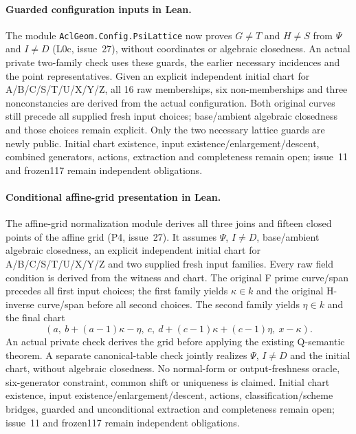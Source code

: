 \documentclass[11pt,oneside]{article}
\theoremstyle{definition}
\theoremstyle{remark}
\newcommand{\lean}[1]{\nolinkurl{#1}}
\begin{document}
\paragraph{Guarded configuration inputs in Lean.}
The module \lean{AclGeom.Config.PsiLattice} now proves $G\ne T$ and
$H\ne S$ from $\Psi$ and $I\ne D$ (L0c, issue~27), without coordinates
or algebraic closedness. An actual private two-family check uses these
guards, the earlier necessary incidences and the point representatives.
Given an explicit independent initial chart for A/B/C/S/T/U/X/Y/Z, all
16 raw memberships, six non-memberships and three nonconstancies are
derived from the actual configuration. Both original curves still precede
all supplied fresh input choices; base/ambient algebraic closedness and
those choices remain explicit. Only the two necessary lattice guards are
newly public. Initial chart existence, input existence/enlargement/descent,
combined generators, actions, extraction and completeness remain open;
issue~11 and frozen117 remain independent obligations.

\clearpage
\paragraph{Conditional affine-grid presentation in Lean.}
The affine-grid normalization module derives all
three joins and fifteen closed points of the affine grid (P4, issue~27).
It assumes $\Psi$, $I\ne D$, base/ambient algebraic closedness, an explicit
independent initial chart for A/B/C/S/T/U/X/Y/Z and two supplied fresh
input families. Every raw field condition is derived from the witness
and chart. The original F prime curve/span precedes all first input
choices; the first family yields $\kappa\in k$ and the original
H-inverse curve/span before all second choices. The second family yields
$\eta\in k$ and the final chart
\[
 (a,\ b+(a-1)\kappa-\eta,\ c,\
 d+(c-1)\kappa+(c-1)\eta,\ x-\kappa).
\]
An actual private check derives the grid before applying the existing
Q-semantic theorem. A separate canonical-table check jointly realizes
$\Psi$, $I\ne D$ and the initial chart, without algebraic closedness.
No normal-form or output-freshness oracle, six-generator constraint,
common shift or uniqueness is claimed. Initial chart existence, input
existence/enlargement/descent, actions, classification/scheme bridges,
guarded and unconditional extraction and completeness remain open;
issue~11 and frozen117 remain independent obligations.
\end{document}
